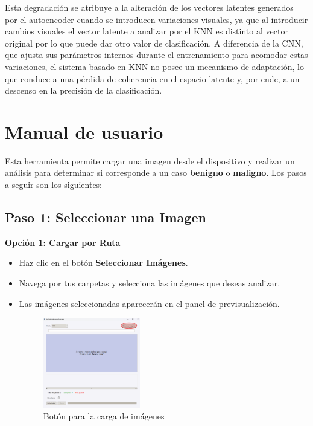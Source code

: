 \documentclass[12pt]{article} %
\begin{document}
Esta degradación se atribuye a la alteración de los vectores latentes generados por el autoencoder cuando se introducen variaciones visuales, ya que al introducir cambios visuales el vector latente a analizar por el KNN es distinto al vector original por lo que puede dar otro valor de clasificación. A diferencia de la CNN, que ajusta sus parámetros internos durante el entrenamiento para acomodar estas variaciones, el sistema basado en KNN no posee un mecanismo de adaptación, lo que conduce a una pérdida de coherencia en el espacio latente y, por ende, a un descenso en la precisión de la clasificación.\\

\section{Manual de usuario}

Esta herramienta permite cargar una imagen desde el dispositivo y realizar un análisis para determinar si corresponde a un caso \textbf{benigno} o \textbf{maligno}. Los pasos a seguir son los siguientes:
\newpage

\subsection*{Paso 1: Seleccionar una Imagen}

\textbf{Opción 1: Cargar por Ruta}
\begin{itemize}
    \item Haz clic en el botón \textbf{Seleccionar Imágenes}.
    \item Navega por tus carpetas y selecciona las imágenes que deseas analizar.
    \item Las imágenes seleccionadas aparecerán en el panel de previsualización.
    \begin{figure}[!ht]
        \centering
        \includegraphics[width=0.4\textwidth]{CargarRuta.png}
        \caption{Botón para la carga de imágenes}
        \label{fig:imagen_carga}
    \end{figure}
\end{itemize}
\end{document}
